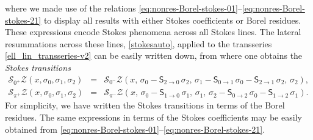 \documentclass[11pt,a4paper]{article}
\begin{document}
%
\noindent
where we made use of the relations \eqref{eq:nonres-Borel-stokes-01}--\eqref{eq:nonres-Borel-stokes-21} to display all results with either Stokes coefficients or Borel residues. These expressions encode Stokes phenomena across all Stokes lines. The lateral resummations across these lines, \eqref{stokesauto}, applied to the transseries \eqref{ell_lin_transseries-v2} can be easily written down, from where one obtains the \textit{Stokes transitions}
%
\begin{eqnarray}
\label{ell-stokes-transitions-0}
\mathcal{S}_{0^+} \mathcal{Z} \left( x, \sigma_0, \sigma_1, \sigma_2 \right) &=& \mathcal{S}_{0^-} \mathcal{Z} \left( x,\, \sigma_0-\mathsf{S}_{2\to 0}\,\sigma_2,\, \sigma_1-\mathsf{S}_{0\to 1}\,\sigma_0 - \mathsf{S}_{2\to 1}\,\sigma_2,\, \sigma_2 \right), \\
\label{ell-stokes-transitions-pi}
\mathcal{S}_{\pi^+} \mathcal{Z} \left( x, \sigma_0, \sigma_1, \sigma_2 \right) &=& \mathcal{S}_{\pi^-} \mathcal{Z} \left( x,\, \sigma_0-\mathsf{S}_{1\to 0}\,\sigma_1,\, \sigma_1,\, \sigma_2-\mathsf{S}_{0\to 2}\,\sigma_0-\mathsf{S}_{1\to 2}\,\sigma_1 \right).
\end{eqnarray}
%
\noindent
For simplicity, we have written the Stokes transitions in terms of the Borel residues. The same expressions in terms of the Stokes coefficients may be easily obtained from \eqref{eq:nonres-Borel-stokes-01}--\eqref{eq:nonres-Borel-stokes-21}.
\end{document}
